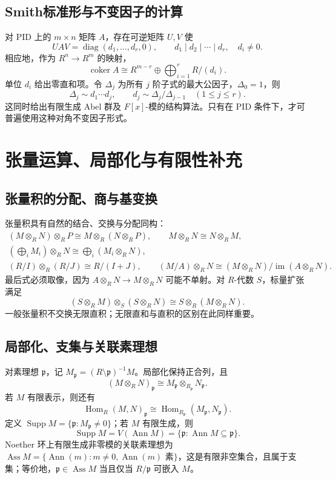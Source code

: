\documentclass[../main.tex]{subfiles}
\begin{document}
\subsection{Smith标准形与不变因子的计算}
对 PID 上的 $m\times n$ 矩阵 $A$，存在可逆矩阵 $U,V$ 使
\[
UAV=\operatorname{diag}(d_1,\ldots,d_r,0),\qquad
d_1\mid d_2\mid\cdots\mid d_r,\quad d_i\ne0.
\]
相应地，作为 $R^n\to R^m$ 的映射，
\[
\operatorname{coker}A\cong R^{m-r}\oplus\bigoplus_{i=1}^rR/(d_i).
\]
单位 $d_i$ 给出零直和项。令 $\Delta_j$ 为所有 $j$ 阶子式的最大公因子，$\Delta_0=1$，则
\[
\Delta_j\sim d_1\cdots d_j,\qquad d_j\sim\Delta_j/\Delta_{j-1}\quad(1\le j\le r).
\]
这同时给出有限生成 Abel 群及 $F[x]$-模的结构算法。只有在 PID 条件下，才可普遍使用这种对角不变因子形式。

\section{张量运算、局部化与有限性补充}
\subsection{张量积的分配、商与基变换}
张量积具有自然的结合、交换与分配同构：
\begin{gather*}
(M\otimes_RN)\otimes_RP\cong M\otimes_R(N\otimes_RP),\qquad
M\otimes_RN\cong N\otimes_RM,\\
\left(\bigoplus_iM_i\right)\otimes_RN\cong\bigoplus_i(M_i\otimes_RN),\\
(R/I)\otimes_R(R/J)\cong R/(I+J),\qquad
(M/A)\otimes_RN\cong(M\otimes_RN)/\operatorname{im}(A\otimes_RN).
\end{gather*}
最后式必须取像，因为 $A\otimes_RN\to M\otimes_RN$ 可能不单射。对 $R$-代数 $S$，标量扩张满足
\[
(S\otimes_RM)\otimes_S(S\otimes_RN)\cong S\otimes_R(M\otimes_RN).
\]
一般张量积不交换无限直积；无限直和与直积的区别在此同样重要。

\subsection{局部化、支集与关联素理想}
对素理想 $\mathfrak p$，记 $M_{\mathfrak p}=(R\setminus\mathfrak p)^{-1}M$。局部化保持正合列，且
\[
(M\otimes_RN)_{\mathfrak p}\cong M_{\mathfrak p}\otimes_{R_{\mathfrak p}}N_{\mathfrak p}.
\]
若 $M$ 有限表示，则还有
\[
\operatorname{Hom}_R(M,N)_{\mathfrak p}
\cong\operatorname{Hom}_{R_{\mathfrak p}}(M_{\mathfrak p},N_{\mathfrak p}).
\]
定义 $\operatorname{Supp}M=\{\mathfrak p:M_{\mathfrak p}\ne0\}$；若 $M$ 有限生成，则
\[
\operatorname{Supp}M=V(\operatorname{Ann}M)
=\{\mathfrak p:\operatorname{Ann}M\subseteq\mathfrak p\}.
\]
Noether 环上有限生成非零模的关联素理想为 $\operatorname{Ass}M=\{\operatorname{Ann}(m):m\ne0,\operatorname{Ann}(m)\text{ 素}\}$，这是有限非空集合，且属于支集；等价地，$\mathfrak p\in\operatorname{Ass}M$ 当且仅当 $R/\mathfrak p$ 可嵌入 $M$。
\end{document}

